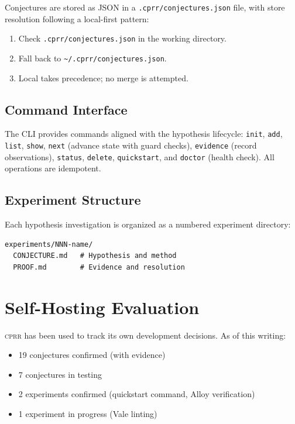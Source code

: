 \documentclass[sigconf,screen]{acmart}
\begin{document}
Conjectures are stored as JSON in a \texttt{.cprr/conjectures.json} file, with store resolution following a local-first pattern:
\begin{enumerate}
\item Check \texttt{.cprr/conjectures.json} in the working directory.
\item Fall back to \texttt{\textasciitilde/.cprr/conjectures.json}.
\item Local takes precedence; no merge is attempted.
\end{enumerate}

\subsection{Command Interface}

The CLI provides commands aligned with the hypothesis lifecycle: \texttt{init}, \texttt{add}, \texttt{list}, \texttt{show}, \texttt{next} (advance state with guard checks), \texttt{evidence} (record observations), \texttt{status}, \texttt{delete}, \texttt{quickstart}, and \texttt{doctor} (health check). All operations are idempotent.

\subsection{Experiment Structure}

Each hypothesis investigation is organized as a numbered experiment directory:

\begin{verbatim}
experiments/NNN-name/
  CONJECTURE.md   # Hypothesis and method
  PROOF.md        # Evidence and resolution
\end{verbatim}

\section{Self-Hosting Evaluation}\label{sec:evaluation}

\textsc{cprr} has been used to track its own development decisions. As of this writing:

\begin{itemize}
\item 19 conjectures confirmed (with evidence)
\item 7 conjectures in testing
\item 2 experiments confirmed (quickstart command, Alloy verification)
\item 1 experiment in progress (Vale linting)
\end{itemize}
\end{document}
